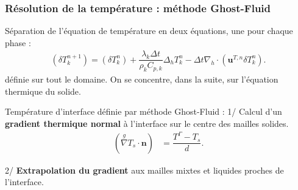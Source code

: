 \documentclass{beamer}
\newcommand{\inte}{\Gamma}
\newcommand{\vect}[1]{\bm{#1}}
\newcommand{\norm}{\vect{n}}
\newcommand{\npl}{{n+1}}
\newcommand{\ghost}{\overset{{g}}{\nabla}}
\renewcommand{\frac}{\dfrac}
\begin{document}
\begin{frame}
    \frametitle{Résolution de la température : méthode Ghost-Fluid}
    	\footnotesize
\begin{ceablock}{Séparation de l'équation de température en deux équations, une pour chaque phase :}
\begin{align}
 (\delta T_k^\npl)   = (\delta T^n_k) + \frac{\lambda_k \Delta t }{\rho_k C_{p,k}}  \Delta_h T_k^n - \Delta t \nabla_h \cdot ( \vect{u}^{T,n} \delta T_k^n).
\end{align}
définie sur tout le domaine. On se concentre, dans la suite, sur l'équation thermique  du solide.
\end{ceablock}

\begin{ceablock}{Température d'interface définie par méthode Ghost-Fluid :}
1/ Calcul d'un \textbf{gradient thermique normal} à l'interface sur le centre des mailles solides.
\begin{align}
 (\ghost T_s \cdot \norm) &= \frac{T^\inte - T_s}{d}.
\end{align}
\end{ceablock}
2/ \textbf{Extrapolation du gradient} aux mailles mixtes et liquides proches de l'interface.
\begin{center}
		\begin{tikzpicture}[scale = 0.65, every node/.style={scale=0.65}]
			
		\end{tikzpicture}

\end{center}
\end{frame}
\end{document}
